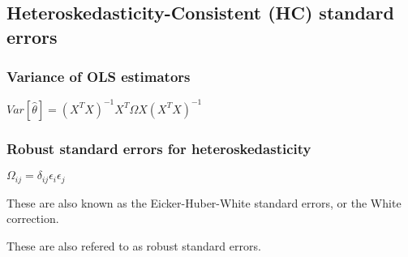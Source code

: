 
\subsection{Heteroskedasticity-Consistent (HC) standard errors}

\subsubsection{Variance of OLS estimators}

\(Var [\hat \theta ]=(X^TX)^{-1}X^T\Omega X(X^TX)^{-1}\)

\subsubsection{Robust standard errors for heteroskedasticity}

\(\Omega_{ij}=\delta_{ij}\epsilon_i\epsilon_j\)

These are also known as the Eicker-Huber-White standard errors, or the White correction.

These are also refered to as robust standard errors.

